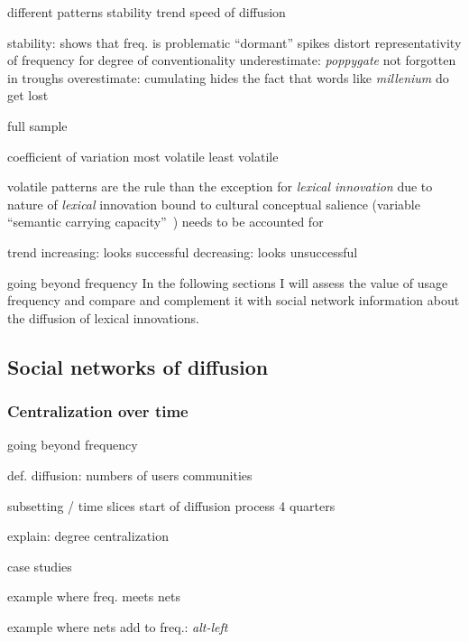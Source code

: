 \documentclass[
  a4paper,
  abstract=on,
  captions=tableabove
  ]{scrartcl}
\begin{document}
  different patterns
    stability
    trend
    speed of diffusion

  stability: shows that freq. is problematic
  \enquote{dormant}
  spikes distort representativity of frequency for degree of conventionality
  underestimate: \emph{poppygate} not forgotten in troughs
  overestimate: cumulating hides the fact that words like \emph{millenium} do get lost


  full sample

  coefficient of variation
  most volatile
  least volatile

  volatile patterns are the rule than the exception for \emph{lexical innovation}
  due to nature of \emph{lexical} innovation
  bound to cultural conceptual salience (variable \enquote{semantic carrying capacity}~\parencite{Nini2017ApplicationGrowth})
  needs to be accounted for

  trend
  increasing: looks successful
  decreasing: looks unsuccessful

  going beyond frequency
  In the following sections I will assess the value of usage frequency and compare and complement it with social network information about the diffusion of lexical innovations.

  \subsection{Social networks of diffusion}
    \label{subsec:sna}

    \subsubsection{Centralization over time}

  going beyond frequency

  def. diffusion:
  numbers of users
  communities

  subsetting / time slices
  start of diffusion process
  4 quarters

  explain: degree centralization

  case studies

  example where freq. meets nets

  example where nets add to freq.: \emph{alt-left}

\end{document}
